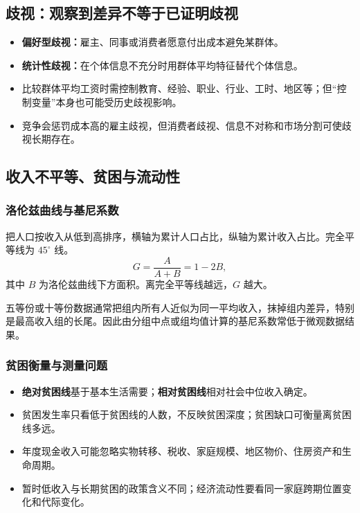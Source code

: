 \documentclass[UTF8,11pt,a4paper]{ctexart}
\newcommand{\term}[1]{\textbf{#1}}
\begin{document}
\subsection{歧视：观察到差异不等于已证明歧视}
\begin{itemize}
  \item \term{偏好型歧视：}雇主、同事或消费者愿意付出成本避免某群体。
  \item \term{统计性歧视：}在个体信息不充分时用群体平均特征替代个体信息。
  \item 比较群体平均工资时需控制教育、经验、职业、行业、工时、地区等；但“控制变量”本身也可能受历史歧视影响。
  \item 竞争会惩罚成本高的雇主歧视，但消费者歧视、信息不对称和市场分割可使歧视长期存在。
\end{itemize}

\subsection{收入不平等、贫困与流动性}
\subsubsection{洛伦兹曲线与基尼系数}
把人口按收入从低到高排序，横轴为累计人口占比，纵轴为累计收入占比。完全平等线为 $45^\circ$ 线。
\[
G=\frac{A}{A+B}=1-2B,
\]
其中 $B$ 为洛伦兹曲线下方面积。离完全平等线越远，$G$ 越大。

\begin{detailbox}[分组数据为何低估不平等]
五等份或十等份数据通常把组内所有人近似为同一平均收入，抹掉组内差异，特别是最高收入组的长尾。因此由分组中点或组均值计算的基尼系数常低于微观数据结果。
\end{detailbox}

\subsubsection{贫困衡量与测量问题}
\begin{itemize}
  \item \term{绝对贫困线}基于基本生活需要；\term{相对贫困线}相对社会中位收入确定。
  \item 贫困发生率只看低于贫困线的人数，不反映贫困深度；贫困缺口可衡量离贫困线多远。
  \item 年度现金收入可能忽略实物转移、税收、家庭规模、地区物价、住房资产和生命周期。
  \item 暂时低收入与长期贫困的政策含义不同；经济流动性要看同一家庭跨期位置变化和代际变化。
\end{itemize}
\end{document}
